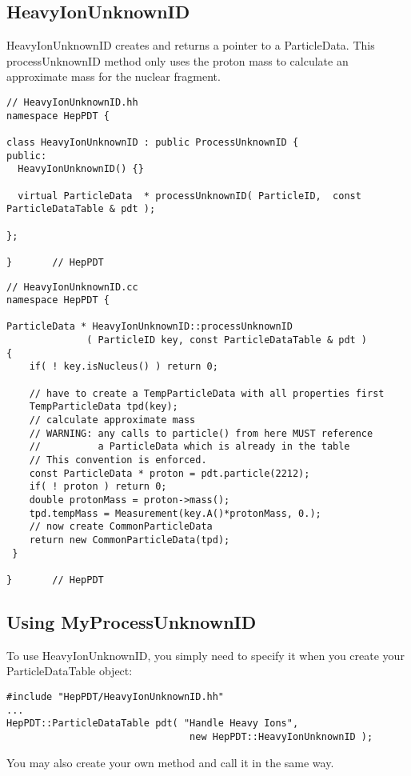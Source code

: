 \subsection { HeavyIonUnknownID }

HeavyIonUnknownID creates and returns a pointer to a ParticleData.
This processUnknownID method only uses the proton mass to calculate
an approximate mass for the nuclear fragment.

\begin{verbatim}
// HeavyIonUnknownID.hh
namespace HepPDT {

class HeavyIonUnknownID : public ProcessUnknownID {
public:
  HeavyIonUnknownID() {}

  virtual ParticleData  * processUnknownID( ParticleID,  const ParticleDataTable & pdt );
    
};

}       // HepPDT

\end{verbatim}

\begin{verbatim}
// HeavyIonUnknownID.cc
namespace HepPDT {

ParticleData * HeavyIonUnknownID::processUnknownID
              ( ParticleID key, const ParticleDataTable & pdt ) 
{ 
    if( ! key.isNucleus() ) return 0;
     
    // have to create a TempParticleData with all properties first
    TempParticleData tpd(key);
    // calculate approximate mass
    // WARNING: any calls to particle() from here MUST reference 
    //          a ParticleData which is already in the table
    // This convention is enforced.
    const ParticleData * proton = pdt.particle(2212);
    if( ! proton ) return 0;
    double protonMass = proton->mass();
    tpd.tempMass = Measurement(key.A()*protonMass, 0.);
    // now create CommonParticleData
    return new CommonParticleData(tpd);
 }

}       // HepPDT

\end{verbatim}


\subsection { Using MyProcessUnknownID }

To use HeavyIonUnknownID, you simply need to specify it when you
create your ParticleDataTable object: 
\begin{verbatim}
#include "HepPDT/HeavyIonUnknownID.hh"
...
HepPDT::ParticleDataTable pdt( "Handle Heavy Ions", 
                                new HepPDT::HeavyIonUnknownID );
\end{verbatim}

You may also create your own method and call it in the same way.


\vfill\eject
